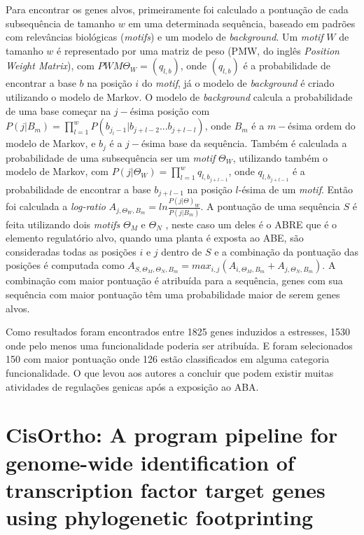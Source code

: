 Para encontrar os genes alvos, primeiramente foi calculado a pontuação de cada subsequência de tamanho $w$ em uma determinada sequência, baseado em padrões com relevâncias biológicas (\textit{motifs}) e um modelo de \textit{background}. Um \textit{motif} $W$ de tamanho $w$ é representado por uma matriz de peso (PMW, do inglês \textit{Position Weight Matrix}), com $PWM \Theta_{W} = (q_{l,b})$, onde $(q_{l,b})$ é a probabilidade de encontrar a base $b$ na posição $i$ do \textit{motif}, já o modelo de \textit{background} é criado utilizando o modelo de Markov. O modelo de 
\textit{background} calcula a probabilidade de uma base começar na $j-$ésima posição com $P(j|B_{m}) = \prod_{l=1}^wP(b_{j_l-1}|b_{j+l-2}...b_{j+l-l})$, onde $B_{m}$ é a $m-$ésima ordem do modelo de Markov, e $b_{j}$ é a $j-$ésima base da sequência. Também é calculada a probabilidade de uma subsequência ser um \textit{motif} $\Theta_{W}$, utilizando também o modelo de Markov, com $P(j|\Theta_{W}) = \prod_{l=1}^w q_{l,b_{j+l-1}}$, onde $q_{l,b_{j+l-1}}$ é a probabilidade de encontrar a base $b_{j+l-1}$ na posição $l$-ésima de um \textit{motif}. Então foi calculada a \textit{log-ratio} $A_{j,\Theta_{W},B_{m}} = ln\frac{P(j|\Theta)_{W}}{P(j|B_{m})}.$ A pontuação de uma sequência $S$ é feita utilizando dois \textit{motifs} $\Theta_{M}$ e $\Theta_{N}$ , neste caso um deles é o ABRE que é o elemento regulatório alvo, quando uma planta é exposta ao ABE, são consideradas todas as posições $i$ e $j$ dentro de $S$ e a combinação da pontuação das posições é computada como $A_{S,\Theta_{M},\Theta_{N},B_{m}} = max_{i,j}(A_{i,\Theta_{M},B_{m}} + A_{j,\Theta_{N},B_{m}})$. A combinação com maior pontuação é atribuída para a sequência, genes com sua sequência com maior pontuação têm uma probabilidade maior de serem genes alvos.

Como resultados foram encontrados entre 1825 genes induzidos a estresses, 1530 onde pelo menos uma funcionalidade poderia ser atribuída. E foram selecionados 150 com maior pontuação onde 126 estão classificados em alguma categoria funcionalidade. O que levou aos autores a concluir que podem existir muitas atividades de regulações genicas após a exposição ao ABA.






\section{CisOrtho: A program pipeline for genome-wide identification of transcription factor target genes using phylogenetic footprinting \cite{Bigelow2004CisOrtho}}

